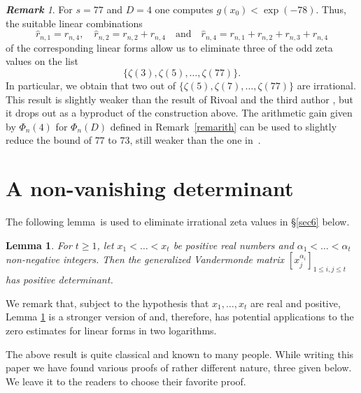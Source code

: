 \documentclass{article}
\numberwithin{equation}{section}
\newtheorem{Lem}{Lemma}
\theoremstyle{remark}
\newtheorem{Rem}{\bf Remark}
\begin{document}
\begin{Rem} \label{remexample}
For $s=77$ and $D=4$ one computes $g(x_0) <  \exp(-78)$. Thus, the suitable linear combinations
$$
		\hat{r}_{n,1}=r_{n,4}, \quad
		\hat{r}_{n,2}=r_{n,2}+r_{n,4} \quad\mbox{and}\quad
		\hat{r}_{n,4}=r_{n,1}+r_{n,2}+r_{n,3}+r_{n,4}
$$
of the corresponding linear forms allow us to eliminate three of the odd zeta values on the list
\[
\{\zeta(3),\zeta(5),\ldots,\zeta(77)\}.
\]
In particular, we obtain that two out of $\{\zeta(5),\zeta(7),\ldots,\zeta(77)\}$ are irrational. This result is slightly weaker than the result of Rivoal and the third author \cite{RZnote}, but it drops out as a byproduct of the construction above. The arithmetic gain given by $\Phi_n(4)$ for $\Phi_n(D)$ defined in Remark~\ref{remarith} can be used to slightly reduce the bound of $77$ to $73$, still weaker than the one in~\cite{RZnote}.
\end{Rem}

\section{A non-vanishing determinant}\label{sec5}

The following lemma~is used to eliminate  irrational zeta values in \S \ref{sec6} below. 

\begin{Lem} \label{lemdet}
For $t\geq 1$, let $x_1<\ldots<x_t$ be positive real numbers and $\alpha_1<\ldots<\alpha_t$ non-negative integers. Then the generalized Vandermonde matrix $[x_j^{\alpha_i}]_{1\leq i,j \leq t}$ has  positive determinant.
\end{Lem}

We remark that, subject to the hypothesis that $x_1,\ldots,x_t$ are real and positive, Lemma \ref{lemdet} is a stronger version of \cite[Lemme 1]{LMN} and, therefore, has potential applications to the zero estimates for linear forms in two logarithms.

\bigskip

The above result is quite classical and known to many people. While writing this paper we have found various proofs of rather different nature, three given below. We leave it to the readers to choose their favorite proof.
\end{document}
